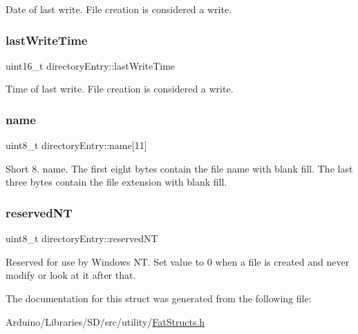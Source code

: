 Date of last write. File creation is considered a write. \mbox{\label{structdirectory_entry_a7bab435322d1928f66fbce53ee1f402d}} 
\subsubsection{\texorpdfstring{last\+Write\+Time}{lastWriteTime}}
{\footnotesize\ttfamily uint16\+\_\+t directory\+Entry\+::last\+Write\+Time}

Time of last write. File creation is considered a write. \mbox{\label{structdirectory_entry_a05dc993ea55a1a742de5970541a31ecb}} 
\subsubsection{\texorpdfstring{name}{name}}
{\footnotesize\ttfamily uint8\+\_\+t directory\+Entry\+::name\mbox{[}11\mbox{]}}

Short 8. name. The first eight bytes contain the file name with blank fill. The last three bytes contain the file extension with blank fill. \mbox{\label{structdirectory_entry_afe7d00be85f3b78549b21610050da52b}} 
\subsubsection{\texorpdfstring{reserved\+NT}{reservedNT}}
{\footnotesize\ttfamily uint8\+\_\+t directory\+Entry\+::reserved\+NT}

Reserved for use by Windows NT. Set value to 0 when a file is created and never modify or look at it after that. 

The documentation for this struct was generated from the following file\+:\begin{DoxyCompactItemize}
\item 
Arduino/\+Libraries/\+S\+D/src/utility/\hyperlink{_fat_structs_8h}{Fat\+Structs.\+h}\end{DoxyCompactItemize}
